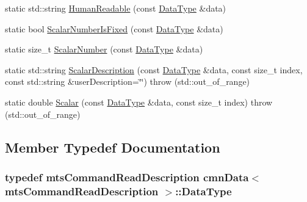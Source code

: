 \begin{DoxyCompactItemize}
\item 
static std\+::string \hyperlink{classcmn_data_3_01mts_command_read_description_01_4_a5a690fa6a4dd5b6a8af05ef5891ec364}{Human\+Readable} (const \hyperlink{classcmn_data_3_01mts_command_read_description_01_4_a1ecbaf4ae55d2af19547b13a35e88618}{Data\+Type} \&data)
\item 
static bool \hyperlink{classcmn_data_3_01mts_command_read_description_01_4_a2d1f0751885a5a54d392c0b2508cd4be}{Scalar\+Number\+Is\+Fixed} (const \hyperlink{classcmn_data_3_01mts_command_read_description_01_4_a1ecbaf4ae55d2af19547b13a35e88618}{Data\+Type} \&data)
\item 
static size\+\_\+t \hyperlink{classcmn_data_3_01mts_command_read_description_01_4_ac623d23856c3c7ab0047f18072c4c863}{Scalar\+Number} (const \hyperlink{classcmn_data_3_01mts_command_read_description_01_4_a1ecbaf4ae55d2af19547b13a35e88618}{Data\+Type} \&data)
\item 
static std\+::string \hyperlink{classcmn_data_3_01mts_command_read_description_01_4_a84383e5413525620b9f1f7bb81b79c49}{Scalar\+Description} (const \hyperlink{classcmn_data_3_01mts_command_read_description_01_4_a1ecbaf4ae55d2af19547b13a35e88618}{Data\+Type} \&data, const size\+\_\+t index, const std\+::string \&user\+Description=\char`\"{}\char`\"{})  throw (std\+::out\+\_\+of\+\_\+range)
\item 
static double \hyperlink{classcmn_data_3_01mts_command_read_description_01_4_a5e3b3855a17f8dd3890e012b7a1e3eb4}{Scalar} (const \hyperlink{classcmn_data_3_01mts_command_read_description_01_4_a1ecbaf4ae55d2af19547b13a35e88618}{Data\+Type} \&data, const size\+\_\+t index)  throw (std\+::out\+\_\+of\+\_\+range)
\end{DoxyCompactItemize}


\subsection{Member Typedef Documentation}
\hypertarget{classcmn_data_3_01mts_command_read_description_01_4_a1ecbaf4ae55d2af19547b13a35e88618}{}
\subsubsection[{Data\+Type}]{\setlength{\rightskip}{0pt plus 5cm}typedef {\bf mts\+Command\+Read\+Description} {\bf cmn\+Data}$<$ {\bf mts\+Command\+Read\+Description} $>$\+::{\bf Data\+Type}}\label{classcmn_data_3_01mts_command_read_description_01_4_a1ecbaf4ae55d2af19547b13a35e88618}


